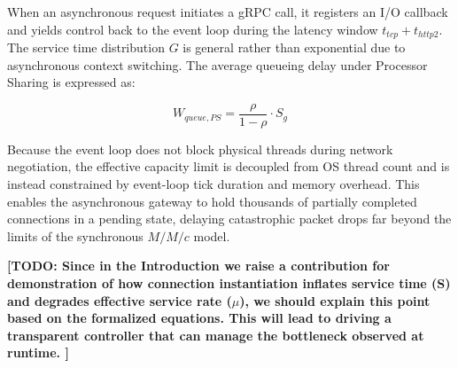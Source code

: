 \documentclass{ieeeaccess}
\newcommand{\todo}[1]{{\color{red}\textbf{[TODO: #1]}}}
\begin{document}
	When an asynchronous request initiates a gRPC call, it registers an I/O callback and yields control back to the event loop during the latency window $t_{tcp} + t_{http2}$. The service time distribution $G$ is general rather than exponential due to asynchronous context switching. The average queueing delay under Processor Sharing is expressed as:
	
	\begin{equation}
		W_{queue, PS} = \frac{\rho}{1 - \rho} \cdot S_{g}
	\end{equation}
	
	Because the event loop does not block physical threads during network negotiation, the effective capacity limit is decoupled from OS thread count and is instead constrained by event-loop tick duration and memory overhead. This enables the asynchronous gateway to hold thousands of partially completed connections in a pending state, delaying catastrophic packet drops far beyond the limits of the synchronous $M/M/c$ model.
	
	\todo{Since in the Introduction we raise a contribution for demonstration of how connection instantiation inflates service time (S) and degrades effective service rate ($\mu$), we should explain this point based on the formalized equations.  This will lead to driving a transparent controller that can manage the bottleneck observed at runtime.
	}
	
	
\end{document}
